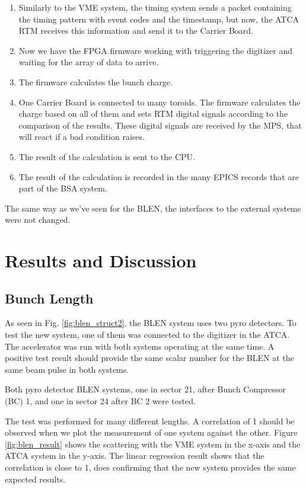 \documentclass[letter,
        biblatex,   %
        keeplastbox,  %
        ]{jacow}
\begin{document}
\begin{enumerate}
  \item Similarly to the VME system, the timing system sends a packet containing the timing pattern with event codes and the timestamp, but now, the ATCA RTM receives this information and send it to the Carrier Board.
  \item Now we have the FPGA firmware working with triggering the digitizer and waiting for the array of data to arrive.
  \item The firmware calculates the bunch charge.
  \item One Carrier Board is connected to many toroids. The firmware calculates the charge based on all of them and sets RTM digital signals according to the comparison of the results. These digital signals are received by the MPS, that will react if a bad condition raises.
  \item The result of the calculation is sent to the CPU.
  \item The result of the calculation is recorded in the many EPICS records that are part of the BSA system.
\end{enumerate}

The same way as we've seen for the BLEN, the interfaces to the external systems were not changed.

\section{Results and Discussion}
\subsection{Bunch Length}
As seen in Fig. \ref{fig:blen_struct2}, the BLEN system uses two pyro detectors. To test the new system, one of them was connected to the digitizer in the ATCA. The accelerator was run with both systems operating at the same time. A positive test result should provide the same scalar number for the BLEN at the same beam pulse in both systems.

Both pyro detector BLEN systems, one in sector 21, after Bunch Compressor (BC) 1, and one in sector 24 after BC 2 were tested.

The test was performed for many different lengths. A correlation of 1 should be observed when we plot the measurement of one system against the other. Figure \ref{fig:blen_result} shows the scattering with the VME system in the x-axis and the ATCA system in the y-axis. The linear regression result shows that the correlation is close to 1, does confirming that the new system provides the same expected results.
\end{document}
